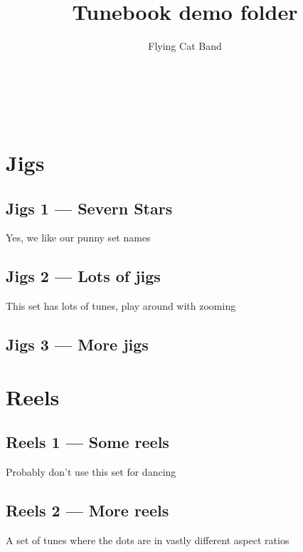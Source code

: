 \documentclass[a4paper,11pt]{article}
\begin{document}
\title{Tunebook demo folder}
\author{Flying Cat Band}

\makeatletter
\begin{titlepage}
    \begin{center}
        {\huge \bfseries  \@title }\\[2ex]
        {\LARGE  \@author}\\[50ex]
    \end{center}
\end{titlepage}
\makeatother
\thispagestyle{empty}
\newpage

\maketitle
\tableofcontents
\clearpage

\setcounter{page}{1} %
\section{Jigs}

\subsection{Jigs 1 --- Severn Stars}
Yes, we like our punny set names
\clearpage

\subsection{Jigs 2 --- Lots of jigs}
This set has lots of tunes, play around with zooming
\clearpage

\subsection{Jigs 3 --- More jigs}
\clearpage

\section{Reels}
\subsection{Reels 1 --- Some reels}
Probably don't use this set for dancing
\clearpage

\subsection{Reels 2 --- More reels}
A set of tunes where the dots are in vastly different aspect ratios
\end{document}
